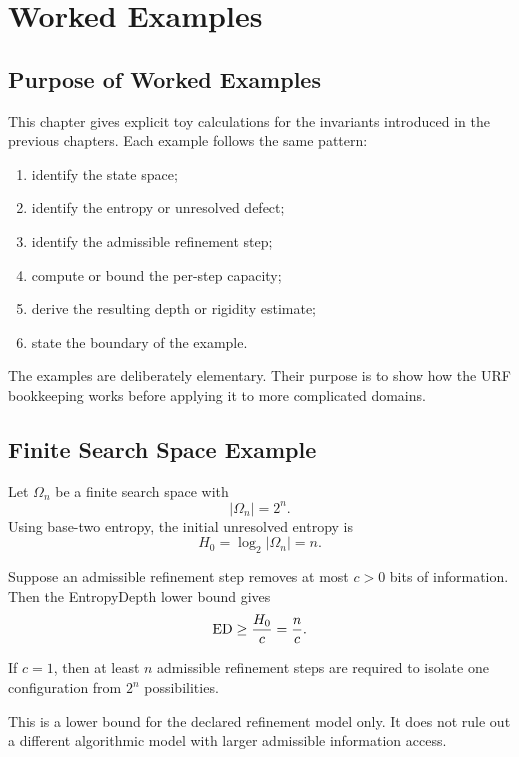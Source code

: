\chapter{Worked Examples}

\section{Purpose of Worked Examples}

This chapter gives explicit toy calculations for the invariants introduced in
the previous chapters. Each example follows the same pattern:

\begin{enumerate}
\item identify the state space;
\item identify the entropy or unresolved defect;
\item identify the admissible refinement step;
\item compute or bound the per-step capacity;
\item derive the resulting depth or rigidity estimate;
\item state the boundary of the example.
\end{enumerate}

The examples are deliberately elementary. Their purpose is to show how the
URF bookkeeping works before applying it to more complicated domains.

\section{Finite Search Space Example}

Let \(\Omega_n\) be a finite search space with
\[
|\Omega_n|=2^n.
\]
Using base-two entropy, the initial unresolved entropy is
\[
H_0=\log_2|\Omega_n|=n.
\]

Suppose an admissible refinement step removes at most \(c>0\) bits of
information. Then the EntropyDepth lower bound gives
\[
\mathrm{ED}\ge \frac{H_0}{c}=\frac{n}{c}.
\]

\begin{example}
If \(c=1\), then at least \(n\) admissible refinement steps are required to
isolate one configuration from \(2^n\) possibilities.
\end{example}

\begin{remark}[Boundary]
This is a lower bound for the declared refinement model only. It does not rule
out a different algorithmic model with larger admissible information access.
\end{remark}

